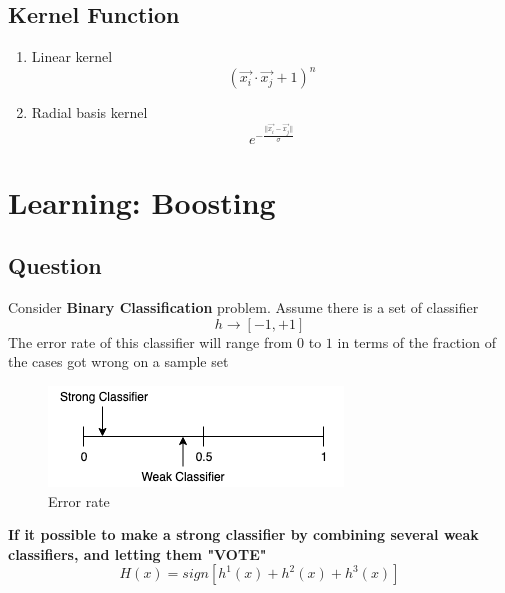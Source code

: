 \documentclass[12pt]{book}
\begin{document}
\subsection{Kernel Function}
\begin{enumerate}
	\item Linear kernel
	$$(\vec{x_i}\cdot\vec{x_j}+1)^n$$
	\item Radial basis kernel 
	$$e^{-\frac{||\vec{x_i}-\vec{x_j}||}{\sigma}}$$
\end{enumerate}
\newpage

\section{Learning: Boosting}
\subsection{Question}
Consider \textbf{Binary Classification} problem. Assume there is a set of classifier
$$h\rightarrow [-1, +1]$$
\indent The error rate of this classifier will range from $0$ to $1$ in terms of the fraction of the cases got wrong on a sample set
\begin{figure}[ht]
	\centering
	\includegraphics[scale=0.6]{Figure/Figure17_1.png}
	\caption{Error rate}
\end{figure}
\newline
\textbf{If it possible to make a strong classifier by combining several weak classifiers, and letting them "VOTE"}
$$H(x)=sign[h^1(x)+h^2(x)+h^3(x)]$$
\end{document}
